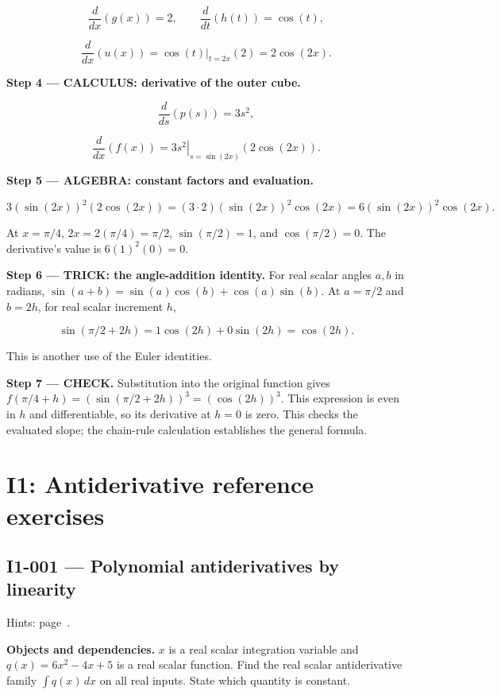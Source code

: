 \documentclass[11pt,oneside,openany]{book}
\begin{document}
\[
\frac{d}{dx}\left(g(x)\right)=2,\qquad
\frac{d}{dt}\left(h(t)\right)=\cos(t),
\]

\[
\frac{d}{dx}\left(u(x)\right)
=\left.\cos(t)\right|_{t=2x}(2)=2\cos(2x).
\]

\textbf{Step 4 --- CALCULUS: derivative of the outer cube.}

\[
\frac{d}{ds}\left(p(s)\right)=3s^2,
\]

\[
\frac{d}{dx}\left(f(x)\right)
=\left.3s^2\right|_{s=\sin(2x)}\left(2\cos(2x)\right).
\]

\begingroup\color{AlgebraBlue}
\textbf{Step 5 --- ALGEBRA: constant factors and evaluation.}

\[
3(\sin(2x))^2(2\cos(2x))
=(3\cdot2)(\sin(2x))^2\cos(2x)
=6(\sin(2x))^2\cos(2x).
\]

At \(x=\pi/4\), \(2x=2(\pi/4)=\pi/2\), \(\sin(\pi/2)=1\), and
\(\cos(\pi/2)=0\). The derivative's value is \(6(1)^2(0)=0\).

\endgroup
\begingroup\color{TrickPurple}
\textbf{Step 6 --- TRICK: the angle-addition identity.} For real scalar angles
\(a,b\) in radians, \(\sin(a+b)=\sin(a)\cos(b)+\cos(a)\sin(b)\).
At \(a=\pi/2\) and \(b=2h\), for real scalar increment \(h\),

\[
\sin(\pi/2+2h)=1\cos(2h)+0\sin(2h)=\cos(2h).
\]

This is another use of the Euler identities.

\endgroup
\textbf{Step 7 --- CHECK.} Substitution into the original function gives
\(f(\pi/4+h)=(\sin(\pi/2+2h))^3=(\cos(2h))^3\).
This expression is even in \(h\) and differentiable,
so its derivative at \(h=0\) is zero. This checks the evaluated slope; the chain-rule
calculation establishes the general formula.

\chapter{I1: Antiderivative reference exercises}
\markright{}
\section{I1-001 --- Polynomial antiderivatives by linearity}
\label{problem:I1-001}
{\small Hints: page~\pageref{hints:I1-001}.}\par\medskip

\textbf{Objects and dependencies.} \(x\) is a real scalar integration variable and
\(q(x)=6x^2-4x+5\) is a real scalar function. Find the real scalar antiderivative
family \(\int q(x)\,dx\) on all real inputs. State which quantity is constant.
\end{document}
